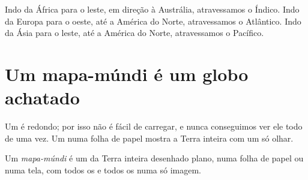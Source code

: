 \begin{example}\label{ex:g3:continents-and-oceans:africa-australia}
Indo da África para o leste, em direção à Austrália, atravessamos o 
Índico. Indo da Europa para o oeste, até a América do Norte, atravessamos
o  Atlântico. Indo da Ásia para o leste, até a América do Norte,
atravessamos o  Pacífico.
\end{example}

\section{Um mapa-múndi é um globo achatado}

Um  é redondo; por isso não é fácil de carregar, e nunca conseguimos
ver ele todo de uma vez. Um  numa folha de papel mostra a Terra inteira
com um só olhar.

\begin{definition}\label{def:g3:continents-and-oceans:world-map}
Um \emph{mapa-múndi} é um  da Terra inteira
desenhado plano, numa folha de papel ou numa tela, com todos os
 e todos os  numa só imagem.
\end{definition}


